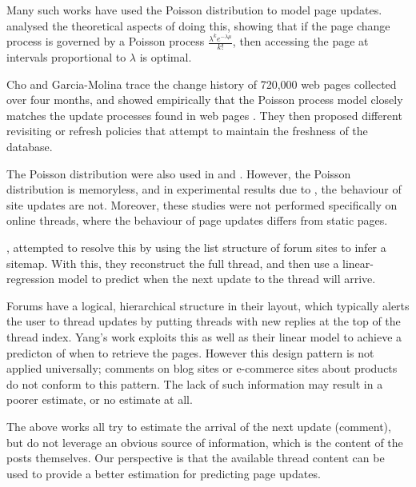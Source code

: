 Many such works have used the Poisson distribution to model page updates.  
 analysed the theoretical aspects of doing this, showing 
that if the page change process is governed by a Poisson process 
$\frac{\lambda^k e^{-\lambda \mu}}{k!}$, then accessing the page at intervals 
proportional to $\lambda$ is optimal.

Cho and Garcia-Molina trace the change history of 720,000 web pages collected 
over four months, and showed empirically that the Poisson process model closely 
matches the update processes found in web pages \cite{Cho1999}. They then 
proposed different revisiting or refresh policies 
\cite{Cho2003,Garcia-molina2003} that attempt to maintain the freshness of the 
database.

The Poisson distribution were also used in  and 
. %
However, the Poisson distribution is memoryless, and in experimental results due 
to , the behaviour of site updates are not. Moreover, these 
studies were not performed specifically on online threads, where the behaviour 
of page updates differs from static pages.

, attempted to resolve this by using the list structure of 
forum sites to infer a sitemap. With this, they reconstruct the full thread, and 
then use a linear-regression model to predict when the next update to the thread 
will arrive. 

Forums have a logical, hierarchical structure in their 
layout, which typically alerts the user to thread updates by putting threads 
with new replies at the top of the thread index. Yang's work exploits this 
as well as their linear model to achieve a predicton of when to retrieve the
pages.  However this design pattern is not applied universally; 
comments on blog sites 
or e-commerce sites about products do not conform to this pattern.  The lack of such 
information may result in a poorer estimate, or no estimate at all.

The above works all try to estimate the arrival of the next update (comment), but do not leverage an obvious source of information, which is the content of the posts themselves. Our perspective
is that the available thread content can be used to provide a better estimation for predicting page updates. 

